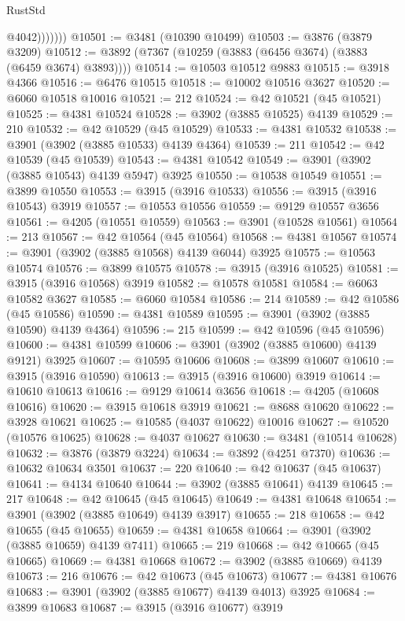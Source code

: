 \begin{lexlean}{RustStd}
\begin{coremodule}
                  @4042)))))))
@10501 := @3481 (@10390 @10499)
@10503 := @3876 (@3879 @3209)
@10512 := @3892 (@7367 (@10259 (@3883 (@6456 @3674) (@3883 (@6459 @3674) @3893))))
@10514 := @10503 @10512 @9883
@10515 := @3918 @4366
@10516 := @6476 @10515
@10518 := @10002 @10516 @3627
@10520 := @6060 @10518 @10016
@10521 := 212
@10524 := @42 @10521 (@45 @10521)
@10525 := @4381 @10524
@10528 := @3902 (@3885 @10525) @4139
@10529 := 210
@10532 := @42 @10529 (@45 @10529)
@10533 := @4381 @10532
@10538 := @3901 (@3902 (@3885 @10533) @4139 @4364)
@10539 := 211
@10542 := @42 @10539 (@45 @10539)
@10543 := @4381 @10542
@10549 := @3901 (@3902 (@3885 @10543) @4139 @5947) @3925
@10550 := @10538 @10549
@10551 := @3899 @10550
@10553 := @3915 (@3916 @10533)
@10556 := @3915 (@3916 @10543) @3919
@10557 := @10553 @10556
@10559 := @9129 @10557 @3656
@10561 := @4205 (@10551 @10559)
@10563 := @3901 (@10528 @10561)
@10564 := 213
@10567 := @42 @10564 (@45 @10564)
@10568 := @4381 @10567
@10574 := @3901 (@3902 (@3885 @10568) @4139 @6044) @3925
@10575 := @10563 @10574
@10576 := @3899 @10575
@10578 := @3915 (@3916 @10525)
@10581 := @3915 (@3916 @10568) @3919
@10582 := @10578 @10581
@10584 := @6063 @10582 @3627
@10585 := @6060 @10584
@10586 := 214
@10589 := @42 @10586 (@45 @10586)
@10590 := @4381 @10589
@10595 := @3901 (@3902 (@3885 @10590) @4139 @4364)
@10596 := 215
@10599 := @42 @10596 (@45 @10596)
@10600 := @4381 @10599
@10606 := @3901 (@3902 (@3885 @10600) @4139 @9121) @3925
@10607 := @10595 @10606
@10608 := @3899 @10607
@10610 := @3915 (@3916 @10590)
@10613 := @3915 (@3916 @10600) @3919
@10614 := @10610 @10613
@10616 := @9129 @10614 @3656
@10618 := @4205 (@10608 @10616)
@10620 := @3915 @10618 @3919
@10621 := @8688 @10620
@10622 := @3928 @10621
@10625 := @10585 (@4037 @10622) @10016
@10627 := @10520 (@10576 @10625)
@10628 := @4037 @10627
@10630 := @3481 (@10514 @10628)
@10632 := @3876 (@3879 @3224)
@10634 := @3892 (@4251 @7370)
@10636 := @10632 @10634 @3501
@10637 := 220
@10640 := @42 @10637 (@45 @10637)
@10641 := @4134 @10640
@10644 := @3902 (@3885 @10641) @4139
@10645 := 217
@10648 := @42 @10645 (@45 @10645)
@10649 := @4381 @10648
@10654 := @3901 (@3902 (@3885 @10649) @4139 @3917)
@10655 := 218
@10658 := @42 @10655 (@45 @10655)
@10659 := @4381 @10658
@10664 := @3901 (@3902 (@3885 @10659) @4139 @7411)
@10665 := 219
@10668 := @42 @10665 (@45 @10665)
@10669 := @4381 @10668
@10672 := @3902 (@3885 @10669) @4139
@10673 := 216
@10676 := @42 @10673 (@45 @10673)
@10677 := @4381 @10676
@10683 := @3901 (@3902 (@3885 @10677) @4139 @4013) @3925
@10684 := @3899 @10683
@10687 := @3915 (@3916 @10677) @3919

\end{coremodule}
\end{lexlean}
